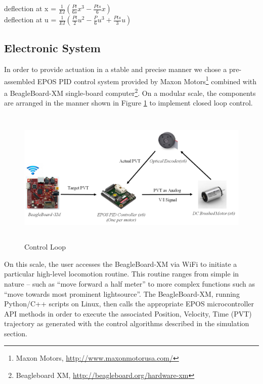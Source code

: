 \documentclass[11pt]{article}
\begin{document}
\vspace{0.5cm}

\begin{center}
deflection at x = $\frac{1}{EI}(\frac{Pt}{6s}x^3 - \frac{Pts}{6}x)$ \\
deflection at u = $\frac{1}{EI}(\frac{Pt}{2}u^2 - \frac{P}{6}u^3 + \frac{Pts}{3}u)$
\end{center}

\subsection{Electronic System}

In order to provide actuation in a stable and precise manner we chose a pre-assembled EPOS PID control system provided by Maxon Motors\footnote{Maxon Motors, \url{http://www.maxonmotorusa.com/}} combined with a BeagleBoard-XM single-board computer\footnote{Beagleboard XM, \url{http://beagleboard.org/hardware-xm}}. On a modular scale, the components are arranged in the manner shown in Figure \ref{fig:closedloop} to implement closed loop control.

\begin{figure}[H]
\centering
\includegraphics[width=14cm,height=6.5cm]{macro_ControlLoop_PAYNE.png}
\caption{Control Loop}
\label{fig:closedloop}
\end{figure}

On this scale, the user accesses the BeagleBoard-XM via WiFi to initiate a particular high-level locomotion routine. This routine ranges from simple in nature – such as “move forward a half meter” to more complex functions such as “move towards most prominent lightsource”. The BeagleBoard-XM, running Python/C++ scripts on Linux, then calls the appropriate EPOS microcontroller API methods in order to execute the associated Position, Velocity, Time (PVT) trajectory as generated with the control algorithms described in the simulation section.
\end{document}
